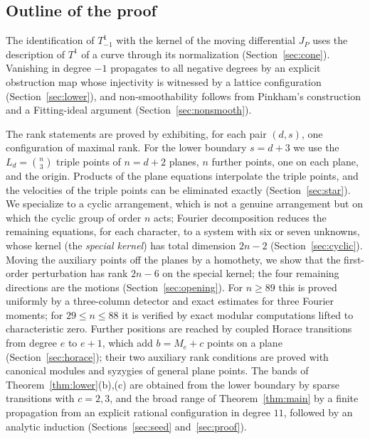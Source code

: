 \documentclass{amsart}
\theoremstyle{definition}
\theoremstyle{remark}
\numberwithin{equation}{section}
\begin{document}
\subsection*{Outline of the proof}
The identification of $T^1_{-1}$ with the kernel of the moving differential
$J_P$ uses the description of $T^1$ of a curve through its normalization
(Section~\ref{sec:cone}). Vanishing in degree $-1$ propagates to all negative degrees by an
explicit obstruction map whose injectivity is witnessed by a lattice configuration
(Section~\ref{sec:lower}), and non-smoothability follows from Pinkham's construction and a
Fitting-ideal argument (Section~\ref{sec:nonsmooth}).

The rank statements are proved by exhibiting, for each pair $(d,s)$, one configuration of
maximal rank. For the lower boundary $s=d+3$ we use the $L_d=\binom n3$ triple points of
$n=d+2$ planes, $n$ further points, one on each plane, and the origin. Products of the plane
equations interpolate the triple points, and the velocities of the triple points can be
eliminated exactly (Section~\ref{sec:star}). We specialize to a cyclic arrangement, which is
not a genuine arrangement but on which the cyclic group of order $n$ acts; Fourier
decomposition reduces the remaining equations, for each character, to a system with six or
seven unknowns, whose kernel (the \emph{special kernel}) has total dimension $2n-2$
(Section~\ref{sec:cyclic}). Moving the auxiliary points off the planes by a homothety, we
show that the first-order perturbation has rank $2n-6$ on the special kernel; the four
remaining directions are the motions (Section~\ref{sec:opening}). For $n\ge89$ this is proved
uniformly by a three-column detector and exact estimates for three Fourier moments; for
$29\le n\le88$ it is verified by exact modular computations lifted to characteristic zero.
Further positions are reached by coupled Horace transitions from degree $e$ to $e+1$, which
add $b=M_e+c$ points on a plane (Section~\ref{sec:horace}); their two auxiliary rank
conditions are proved with canonical modules and syzygies of general plane points. The bands
of Theorem~\ref{thm:lower}(b),(c) are obtained from the lower boundary by sparse transitions
with $c=2,3$, and the broad range of Theorem~\ref{thm:main} by a finite propagation from an
explicit rational configuration in degree $11$, followed by an analytic induction
(Sections~\ref{sec:seed} and~\ref{sec:proof}).
\end{document}
